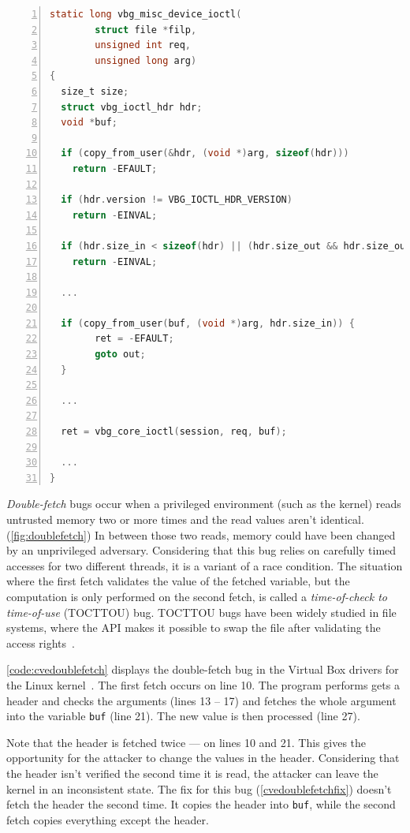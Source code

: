 \begin{lstlisting}[language=C, caption=Abridged CVE-2018-12633 Double Fetch in Linux,
                  label=code:cvedoublefetch,  breaklines=true
                  postbreak=\mbox{\textcolor{red}{$\hookrightarrow$}\space},
                  numbers=left,basicstyle=\scriptsize]
static long vbg_misc_device_ioctl(
        struct file *filp,
        unsigned int req,
        unsigned long arg)
{
  size_t size;
  struct vbg_ioctl_hdr hdr;
  void *buf;

  if (copy_from_user(&hdr, (void *)arg, sizeof(hdr))) 
    return -EFAULT;
  
  if (hdr.version != VBG_IOCTL_HDR_VERSION) 
    return -EINVAL;
   
  if (hdr.size_in < sizeof(hdr) || (hdr.size_out && hdr.size_out < sizeof(hdr)))
    return -EINVAL;
  
  ...
  
  if (copy_from_user(buf, (void *)arg, hdr.size_in)) {
		ret = -EFAULT;
		goto out;
  }

  ...

  ret = vbg_core_ioctl(session, req, buf);

  ...
}
\end{lstlisting}
\emph{Double-fetch} bugs occur when a privileged environment (such as the
kernel) reads untrusted memory two or more times and the read values aren't
identical. (\autoref{fig:doublefetch}) In between those two reads, memory could
have been changed by an unprivileged adversary. Considering that this bug relies
on carefully timed accesses for two different threads, it is a variant of a race
condition. The situation where the first fetch validates the value of the
fetched variable, but the computation is only performed on the second fetch, is
called a \emph{time-of-check to time-of-use} (TOCTTOU) bug. TOCTTOU bugs have
been widely studied in file systems, where the API makes it possible to swap the
file after validating the access rights~\cite{payer2012protecting,
pu2006methodical, wei2010modeling, tsafrir2008portably}.

\autoref{code:cvedoublefetch} displays the double-fetch bug in the Virtual Box
drivers for the Linux kernel~\cite{cve201812633}. The first fetch occurs on line
10. The program performs gets a header and checks the arguments (lines 13 -- 17)
and fetches the whole argument into the variable \texttt{buf} (line 21). The new
value is then processed (line 27).

Note that the header is fetched twice --- on lines 10 and 21. This gives the
opportunity for the attacker to change the values in the header. Considering
that the header isn't verified the second time it is read, the attacker can
leave the kernel in an inconsistent state. The fix for this bug
(\autoref{cvedoublefetchfix}) doesn't fetch the header the second time. It
copies the header into \texttt{buf}, while the second fetch copies everything
except the header.


